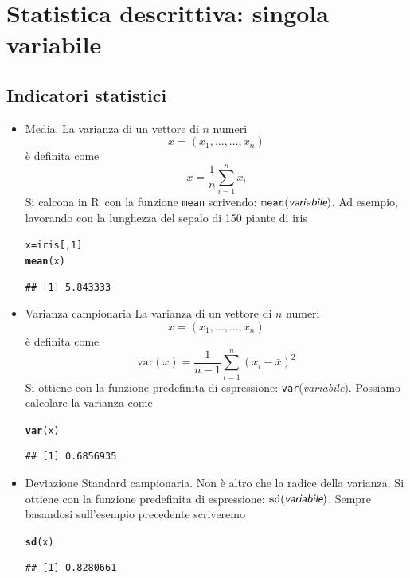 \documentclass[onecolumn,12pt]{book}\usepackage[]{graphicx}\usepackage[]{color}
\makeatletter
\newcommand{\hlnum}[1]{\textcolor[rgb]{0.686,0.059,0.569}{#1}}%
\newcommand{\hlstd}[1]{\textcolor[rgb]{0.345,0.345,0.345}{#1}}%
\newcommand{\hlkwb}[1]{\textcolor[rgb]{0.69,0.353,0.396}{#1}}%
\newcommand{\hlkwd}[1]{\textcolor[rgb]{0.737,0.353,0.396}{\textbf{#1}}}%
\newenvironment{kframe}{%
 \def\at@end@of@kframe{}%
 \ifinner\ifhmode%
  \def\at@end@of@kframe{\end{minipage}}%
  \begin{minipage}{\columnwidth}%
 \fi\fi%
 \def\FrameCommand##1{\hskip\@totalleftmargin \hskip-\fboxsep
 \colorbox{shadecolor}{##1}\hskip-\fboxsep
     \hskip-\linewidth \hskip-\@totalleftmargin \hskip\columnwidth}%
 \MakeFramed {\advance\hsize-\width
   \@totalleftmargin\z@ \linewidth\hsize
   \@setminipage}}%
 {\par\unskip\endMakeFramed%
 \at@end@of@kframe}
\newenvironment{knitrout}{}{} %
\newcommand{\varia}[1]{\textsl{\textsf{#1}}}
\newcommand{\rpr}{\textsf{R}~}
\makeatother
\begin{document}
\section{Statistica descrittiva: singola variabile}
\subsection{Indicatori statistici}
\begin{itemize}
\item{}Media.\vskip0pt
La varianza di un vettore di $n$ numeri
\[x=(x_1,\ldots,\ldots,x_n)\] 
\`e definita come
\[ \bar{x}=\frac 1 n \sum_{i=1}^n x_i\]
Si calcona in \rpr con la funzione \texttt{mean} scrivendo:
$\texttt{mean}(\varia{variabile})$.
Ad esempio, lavorando con la lunghezza del sepalo di 150 piante di iris
\begin{knitrout}
\color{fgcolor}\begin{kframe}
\begin{alltt}
\hlstd{x}\hlkwb{=}\hlstd{iris[,}\hlnum{1}\hlstd{]}
\hlkwd{mean}\hlstd{(x)}
\end{alltt}
\begin{verbatim}
## [1] 5.843333
\end{verbatim}
\end{kframe}
\end{knitrout}
\item{}Varianza campionaria\vskip0pt
La varianza di un vettore di $n$ numeri
\[x=(x_1,\ldots,\ldots,x_n)\]
\`e definita come
\[  \mathrm{var}(x)=\dfrac{1}{n-1}\sum_{i=1}^n(x_i-\bar{x})^2\]
Si ottiene con la funzione predefinita di espressione:
\texttt{var}(\varia{variabile}).
Possiamo calcolare la varianza come
\begin{knitrout}
\color{fgcolor}\begin{kframe}
\begin{alltt}
\hlkwd{var}\hlstd{(x)}
\end{alltt}
\begin{verbatim}
## [1] 0.6856935
\end{verbatim}
\end{kframe}
\end{knitrout}
\item{}Deviazione Standard campionaria.\vskip0pt
Non \`e altro che la radice della varianza. Si ottiene con la funzione predefinita di espressione:
$\texttt{sd}(\varia{variabile})$.
Sempre basandosi sull'esempio precedente scriveremo
\begin{knitrout}
\color{fgcolor}\begin{kframe}
\begin{alltt}
\hlkwd{sd}\hlstd{(x)}
\end{alltt}
\begin{verbatim}
## [1] 0.8280661
\end{verbatim}
\end{kframe}
\end{knitrout}


\end{itemize}
\end{document}
